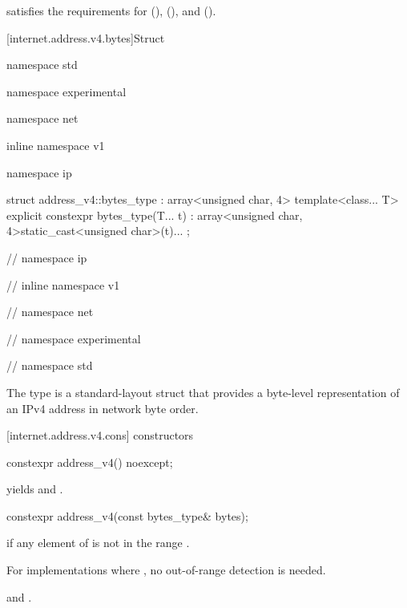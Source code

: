 \pnum
{} satisfies the requirements for  (),  (), and  ().


[internet.address.v4.bytes]{Struct }

%
\begin{codeblock}
namespace std {
namespace experimental {
namespace net {
inline namespace v1 {
namespace ip {

  struct address_v4::bytes_type : array<unsigned char, 4>
  {
    template<class... T> explicit constexpr bytes_type(T... t)
      : array<unsigned char, 4>{{static_cast<unsigned char>(t)...}} {}
  };

} // namespace ip
} // inline namespace v1
} // namespace net
} // namespace experimental
} // namespace std
\end{codeblock}

\pnum
The  type is a standard-layout struct that provides a byte-level representation of an IPv4 address in network byte order.



%
[internet.address.v4.cons]{ constructors}

\begin{itemdecl}
constexpr address_v4() noexcept;
\end{itemdecl}

\begin{itemdescr}
\pnum
\postconditions {} yields  and .
\end{itemdescr}

\begin{itemdecl}
constexpr address_v4(const bytes_type& bytes);
\end{itemdecl}

\begin{itemdescr}
\pnum
\remarks {} if any element of  is not in the range \tcode{[0, 0xFF]}. \begin{note} For implementations where , no out-of-range detection is needed. \end{note}

\pnum
\postconditions {} and .
\end{itemdescr}

